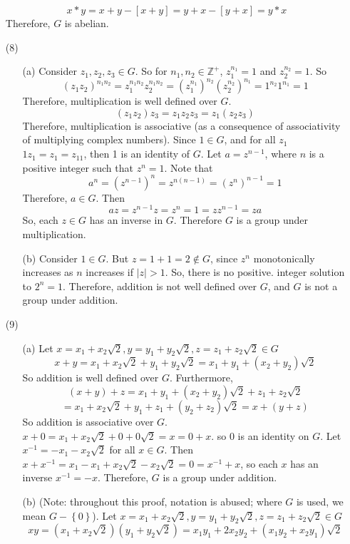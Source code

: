 \documentclass[12pt]{article}
\begin{document}
\begin{itemize}
$$x * y = x + y - [x + y] = y + x - [y + x] = y * x$$
Therefore, $G$ is abelian.
\item[(8)]
\begin{itemize}
\item[(a)] Consider $z_1, z_2, z_3 \in G$. So for $n_1, n_2 \in \mathbb{Z}^+$, $z_1^{n_1} = 1$ and $z_2^{n_2} = 1$. So
$$(z_1z_2)^{n_1n_2} = z_1^{n_1n_2}z_2^{n_1n_2} = (z_1^{n_1})^{n_2}(z_2^{n_2})^{n_1} = 1^{n_2}1^{n_1} = 1$$
Therefore, multiplication is well defined over $G$.
$$(z_1z_2)z_3 = z_1z_2z_3 = z_1(z_2z_3)$$
Therefore, multiplication is associative (as a consequence of associativity of multiplying complex numbers). Since $1 \in G$, and for all $z_1$ $1z_1 = z_1 = z_11$, then 1 is an identity of $G$. Let $a = z^{n - 1}$, where $n$ is a positive integer such that $z^n = 1$. Note that
$$a^n = (z^{n-1})^n = z^{n(n - 1)} = (z^n)^{n - 1} = 1$$
Therefore, $a \in G$. Then
$$az = z^{n-1}z = z^n = 1 = zz^{n-1} = za$$
So, each $z \in G$ has an inverse in $G$. Therefore $G$ is a group under multiplication.
\item[(b)] Consider $1 \in G$. But $z = 1 + 1 = 2 \not \in G$, since $z^n$ monotonically increases as $n$ increases if $|z| > 1$. So, there is no positive. integer solution to $2^n = 1$. Therefore, addition is not well defined over $G$, and $G$ is not a group under addition.
\end{itemize}
\item[(9)]
\begin{itemize}
\item[(a)]
Let $x = x_1 + x_2\sqrt{2}, y = y_1 + y_2\sqrt{2}, z = z_1 + z_2\sqrt{2} \in G$
$$x + y = x_1 + x_2\sqrt{2} + y_1 + y_2\sqrt{2} = x_1 + y_1 + (x_2 + y_2)\sqrt{2}$$
So addition is well defined over $G$. Furthermore,
$$(x + y) + z = x_1 + y_1 + (x_2 + y_2)\sqrt{2} + z_1 + z_2\sqrt{2}$$
$$ = x_1 + x_2\sqrt{2} + y_1 + z_1 + (y_2 + z_2)\sqrt{2} = x + (y + z)$$
So addition is associative over $G$. $x + 0 = x_1 + x_2\sqrt{2} + 0 + 0\sqrt{2} = x = 0 + x$. so $0$ is an identity on $G$. Let $x^{-1} = -x_1 - x_2\sqrt{2}$ for all $x \in G$. Then $x + x^{-1} = x_1 - x_1 + x_2\sqrt{2} - x_2\sqrt{2} = 0 = x^{-1} + x$, so each $x$ has an inverse $x^{-1} = -x$. Therefore, $G$ is a group under addition.
\item[(b)]
(Note: throughout this proof, notation is abused; where $G$ is used, we mean $G - \left\lbrace 0 \right\rbrace$). Let $x = x_1 + x_2\sqrt{2}, y = y_1 + y_2\sqrt{2}, z = z_1 + z_2\sqrt{2} \in G$
$$xy = (x_1 + x_2\sqrt{2})(y_1 + y_2\sqrt{2}) = x_1y_1 + 2x_2y_2 + (x_1y_2 + x_2y_1)\sqrt{2}$$

\end{itemize}
\end{itemize}
\end{document}
